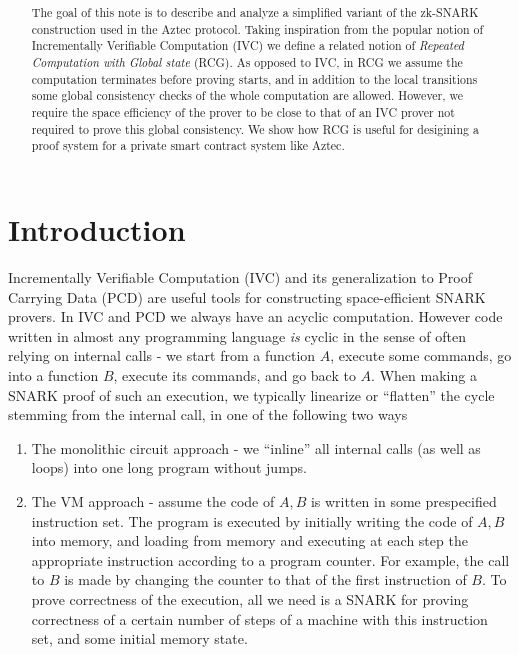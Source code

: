 \documentclass[11pt]{article} %
\title{ \papertitle \\[0.72cm]}
\author{}
\begin{document}
    \maketitle
\begin{abstract}
The goal of this note is to describe and analyze a simplified variant of the zk-SNARK construction used in the Aztec protocol.
Taking inspiration from the popular notion of Incrementally Verifiable Computation\cite{ivc} (IVC)
we define a related notion of \emph{Repeated Computation with Global state} (RCG). As opposed to IVC, in RCG we assume the computation terminates before proving starts, and in addition to the local transitions some global consistency checks of the whole computation are allowed. However, we require the space efficiency of the prover to be close to that of an IVC prover not required to prove this global consistency.
We show how RCG is useful for desigining a proof system for a private smart contract system like Aztec.
\end{abstract}
\section{Introduction}
Incrementally Verifiable Computation (IVC) \cite{ivc} and its generalization to Proof Carrying Data (PCD) \cite{pcd} are useful tools for constructing space-efficient SNARK provers.
In IVC and PCD we always have an acyclic computation.
However code written in almost any programming language \emph{is} cyclic in the sense of often relying on internal calls - 
we start from a function $A$, execute some commands, go into a function $B$, execute its commands, and go back to $A$.
When making a SNARK proof of such an execution, we typically linearize or ``flatten'' the cycle stemming from  the internal call, in one of the following two ways
\begin{enumerate}
 \item The monolithic circuit approach - we ``inline'' all internal calls (as well as loops) into one long program without jumps.
 \item The VM approach - assume the code of $A,B$ is written in some prespecified instruction set. The program is executed by initially writing the code of $A,B$ into memory, and loading from memory and executing at each step the appropriate instruction according to a program counter. For example, the call to $B$ is made by changing the counter to that of the  first instruction of $B$. To prove correctness of the execution, all we need is a SNARK for proving correctness of a certain number of steps of a machine with this instruction set, and some initial memory state.
\end{enumerate}
\end{document}
